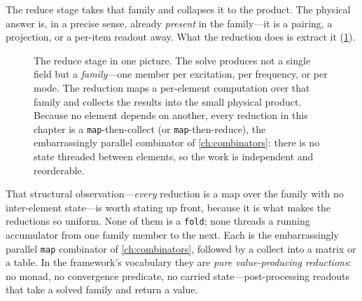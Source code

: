 The reduce stage takes that family and collapses it to the product. The
physical answer is, in a precise sense, already \emph{present} in the family---it
is a pairing, a projection, or a per-item readout away. What the reduction does
is extract it (\cref{fig:red-pipeline}).

\begin{figure}[t]
\centering
{}
\caption[The family-to-product pipeline]{The reduce stage in one picture. The
solve produces not a single field but a \emph{family}---one member per
excitation, per frequency, or per mode. The reduction maps a per-element
computation over that family and collects the results into the small physical
product. Because no element depends on another, every reduction in this chapter
is a \texttt{map}-then-collect (or \texttt{map}-then-reduce), the embarrassingly
parallel combinator of \cref{ch:combinators}: there is no state threaded between
elements, so the work is independent and reorderable.}
\label{fig:red-pipeline}
\end{figure}

That structural observation---\emph{every} reduction is a map over the family
with no inter-element state---is worth stating up front, because it is what
makes the reductions so uniform. None of them is a \texttt{fold}; none threads a
running accumulator from one family member to the next. Each is the
embarrassingly parallel \texttt{map} combinator of \cref{ch:combinators},
followed by a collect into a matrix or a table. In the framework's vocabulary
they are \emph{pure value-producing reductions}: no  monad, no
convergence predicate, no carried state---post-processing readouts that take a
solved family and return a value.

